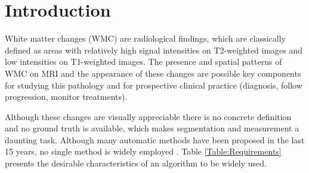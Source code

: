 \section{Introduction}


White matter changes (WMC) are radiological findings, which are classically defined as areas with relatively high signal intensities on T2-weighted images and low intensities on T1-weighted images. The presence and spatial patterns of WMC on MRI and the appearance of these changes are possible key components for studying this pathology and for prospective clinical practice (diagnosis, follow progression, monitor treatments).

Although these changes are visually appreciable there is no concrete definition and no ground truth is available, which makes segmentation and measurement a daunting task. Although many automatic methods have been proposed in the last 15 years, no single method is widely employed \cite{GarciaReview}. Table \ref{Table:Requirements} presents the desirable characteristics of an algorithm to be widely used.
    